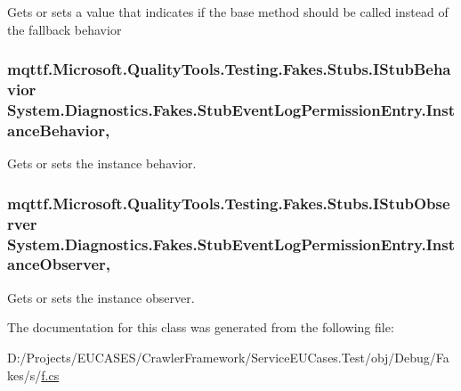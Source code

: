 Gets or sets a value that indicates if the base method should be called instead of the fallback behavior

\hypertarget{class_system_1_1_diagnostics_1_1_fakes_1_1_stub_event_log_permission_entry_a0d1435320e4264ed2925d30ad1ef5e06}{
\subsubsection[{Instance\-Behavior}]{\setlength{\rightskip}{0pt plus 5cm}mqttf.\-Microsoft.\-Quality\-Tools.\-Testing.\-Fakes.\-Stubs.\-I\-Stub\-Behavior System.\-Diagnostics.\-Fakes.\-Stub\-Event\-Log\-Permission\-Entry.\-Instance\-Behavior\hspace{0.3cm}{\ttfamily [get]}, {\ttfamily [set]}}}\label{class_system_1_1_diagnostics_1_1_fakes_1_1_stub_event_log_permission_entry_a0d1435320e4264ed2925d30ad1ef5e06}


Gets or sets the instance behavior.

\hypertarget{class_system_1_1_diagnostics_1_1_fakes_1_1_stub_event_log_permission_entry_a87aabc17b380ea1b4c64dc7d8038b4a3}{
\subsubsection[{Instance\-Observer}]{\setlength{\rightskip}{0pt plus 5cm}mqttf.\-Microsoft.\-Quality\-Tools.\-Testing.\-Fakes.\-Stubs.\-I\-Stub\-Observer System.\-Diagnostics.\-Fakes.\-Stub\-Event\-Log\-Permission\-Entry.\-Instance\-Observer\hspace{0.3cm}{\ttfamily [get]}, {\ttfamily [set]}}}\label{class_system_1_1_diagnostics_1_1_fakes_1_1_stub_event_log_permission_entry_a87aabc17b380ea1b4c64dc7d8038b4a3}


Gets or sets the instance observer.



The documentation for this class was generated from the following file\-:\begin{DoxyCompactItemize}
\item 
D\-:/\-Projects/\-E\-U\-C\-A\-S\-E\-S/\-Crawler\-Framework/\-Service\-E\-U\-Cases.\-Test/obj/\-Debug/\-Fakes/s/\hyperlink{s_2f_8cs}{f.\-cs}\end{DoxyCompactItemize}
